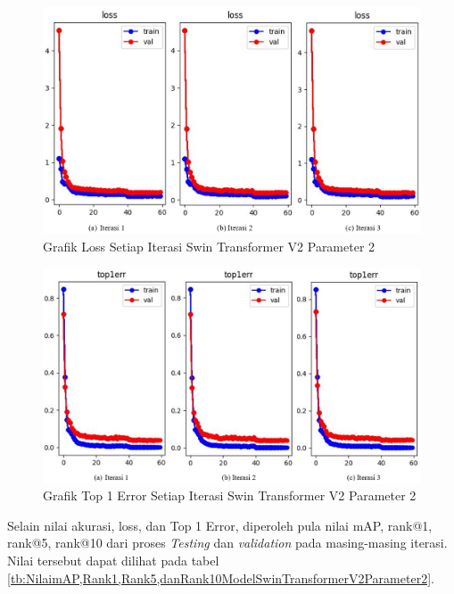 \begin{figure}[ht]
  \centering
  \includegraphics[scale=0.575]{gambar/Train SwinV2CP1 Loss.png}
  \caption{Grafik Loss Setiap Iterasi Swin Transformer V2 Parameter 2}
  \label{fig:grafiklossdariswinv2parameter2}
\end{figure}

\begin{figure}[ht]
  \centering
  \includegraphics[scale=0.575]{gambar/Train SwinV2CP1 Top1Err.png}
  \caption{Grafik Top 1 Error Setiap Iterasi Swin Transformer V2 Parameter 2}
  \label{fig:grafiktop1errdariswinv2parameter2}
\end{figure}

Selain nilai akurasi, loss, dan Top 1 Error, diperoleh pula nilai mAP, rank@1, 
rank@5, rank@10 dari proses \emph{Testing} dan \emph{validation} pada 
masing-masing iterasi. Nilai tersebut dapat dilihat pada tabel 
\ref{tb:NilaimAP,Rank1,Rank5,danRank10ModelSwinTransformerV2Parameter2}.\\

